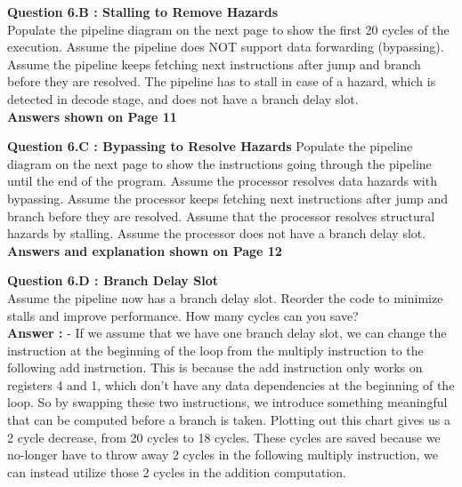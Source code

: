 \documentclass[a4paper,11pt]{article}
\newcommand{\answer}{\textbf{Answer : }}
\begin{document}
\item \textbf{Question 6.B : Stalling to Remove Hazards} \\

  Populate the pipeline diagram on the next page to show the first 20 cycles of the execution. Assume the pipeline does NOT support data forwarding (bypassing). Assume the pipeline keeps fetching next instructions after jump and branch before they are resolved. The pipeline has to stall in case of a hazard, which is detected in decode stage, and does not have a branch delay slot. \\

  \textbf{Answers shown on Page 11}\\

\item \textbf{Question 6.C : Bypassing to Resolve Hazards} 
Populate the pipeline diagram on the next page to show the instructions going through the pipeline until the end of the program. Assume the processor resolves data hazards with bypassing. Assume the processor keeps fetching next instructions after jump and branch before they are resolved. Assume that the processor resolves structural hazards by stalling. Assume the processor does not have a branch delay slot. \\

\textbf{Answers and explanation shown on Page 12} \\

\item \textbf{Question 6.D : Branch Delay Slot} \\
Assume the pipeline now has a branch delay slot. Reorder the code to minimize stalls and improve performance. How many cycles can you save? \\

\answer - If we assume that we have one branch delay slot, we can change the instruction at the beginning of the loop from the multiply instruction to the following add instruction. This is because the add instruction only works on registers 4 and 1, which don't have any data dependencies at the beginning of the loop. So by swapping these two instructions, we introduce something meaningful that can be computed before a branch is taken. Plotting out this chart gives us a 2 cycle decrease, from 20 cycles to 18 cycles. These cycles are saved because we no-longer have to throw away 2 cycles in the following multiply instruction, we can instead utilize those 2 cycles in the addition computation.
\end{document}

